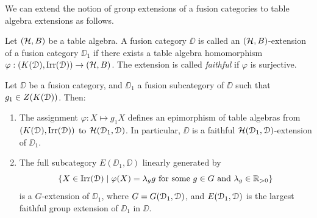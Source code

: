 \documentclass{amsart}
\begin{document}
 We can extend the notion of group extensions of a fusion categories to table algebra extensions as follows. 
\begin{defn} \label{d:table-alg-extension}
Let $(\mathcal{H}, B)$ be a table algebra. A fusion category $\DD$ is called an $(\mathcal{H}, B)$-extension of a fusion category $\DD_1$ if there exists a table algebra homomorphism $\varphi: (K({\EuScript{D}}), {\operatorname{Irr}({\EuScript{D}})}) \to (\mathcal{H}, B)$. The extension is called \emph{faithful} if $\varphi$ is surjective.
\end{defn}

\begin{cor}\label{c:max-G-extension} Let $\DD$ be a fusion category, and $\DD_1$ a  fusion subcategory of $\DD$ such that $g_1 \in Z({K({\EuScript{D}})})$.  Then:
\begin{enumerate}
 \item The assignment $\varphi :X \mapsto g_1 X$ defines  an epimorphism of table algebras from $({K({\EuScript{D}})}, {\operatorname{Irr}({\EuScript{D}})})$ to $\mathcal{H}({\EuScript{D}}_1, {\EuScript{D}})$. In particular, $\DD$ is a faithful $\mathcal{H}({\EuScript{D}}_1, {\EuScript{D}})$-extension of $\DD_1$. 
\item The full subcategory $E(\DD_1, \DD)$ linearly generated by
$$ 
\{X \in {\operatorname{Irr}({\EuScript{D}})} \mid \varphi(X) = \lambda_g g \text{ for some $g \in G$ and $\lambda_g \in {\mathbb{R}_{> 0}}$} \}
$$
is a $G$-extension of $\DD_1$, where $G={G({\EuScript{D}}_1, {\EuScript{D}})}$, and ${E({\EuScript{D}}_1, {\EuScript{D}})}$ is the largest faithful group extension of $\DD_1$ in $\DD$.
\end{enumerate}
\end{cor}
\end{document}
